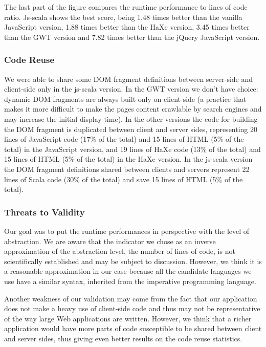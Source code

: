 \documentclass[preprint]{sigplanconf}
\begin{document}
The last part of the figure compares the runtime performance to lines of code ratio. Js-scala shows
the best score, being 1.48 times better than the vanilla JavaScript version, 1.88 times better than
the HaXe version, 3.45 times better than the GWT version and 7.82 times better than the jQuery
JavaScript version.

\subsubsection{Code Reuse}

We were able to share some DOM fragment definitions between server-side and client-side only in
the js-scala version. In the GWT version we don’t have choice: dynamic DOM fragments are always
built only on client-side (a practice that makes it more difficult to make the pages content
crawlable by search engines and may increase the initial display time). In the other versions the
code for building the DOM fragment is duplicated between client and server sides, representing 20
lines of JavaScript code (17\% of the total) and 15 lines of HTML (5\% of the total) in the
JavaScript version, and 19 lines of HaXe code (13\% of the total) and 15 lines of HTML (5\%
of the total) in the HaXe version. In the js-scala version the DOM fragment definitions shared
between clients and servers represent 22 lines of Scala code (30\% of the total) and save 15 lines
of HTML (5\% of the total).

\subsubsection{Threats to Validity}

Our goal was to put the runtime performances in perspective with the level of abstraction. We are
aware that the indicator we chose as an inverse approximation of the abstraction level, the number
of lines of code, is not scientifically established and may be subject to discussion. However, we
think it is a reasonable approximation in our case because all the candidate languages we use have
a similar syntax, inherited from the imperative programming language.

Another weakness of our validation may come from the fact that our application does not make a
heavy use of client-side code and thus may not be representative of the way large Web applications
are written. However, we think that a richer application would have more parts of code susceptible
to be shared between client and server sides, thus giving even better results on the code reuse
statistics.
\end{document}
